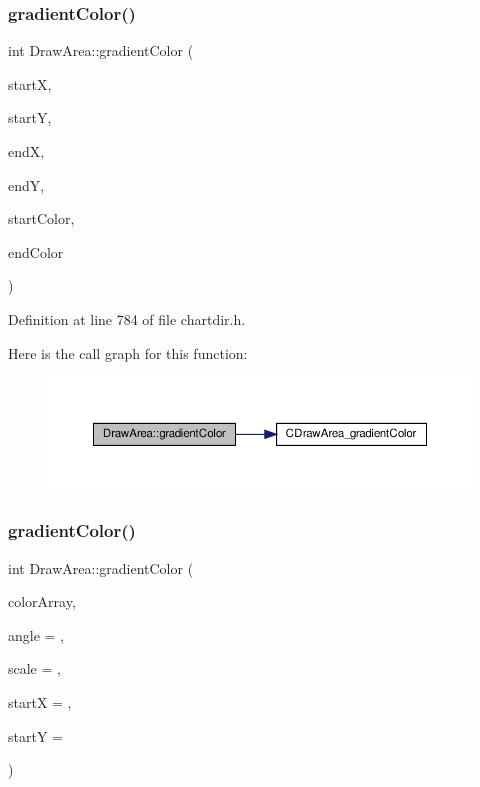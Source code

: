 \subsubsection{\texorpdfstring{gradient\+Color()}{gradientColor()}\hspace{0.1cm}{\footnotesize\ttfamily [1/3]}}
{\footnotesize\ttfamily int Draw\+Area\+::gradient\+Color (\begin{DoxyParamCaption}\item[{int}]{startX,  }\item[{int}]{startY,  }\item[{int}]{endX,  }\item[{int}]{endY,  }\item[{int}]{start\+Color,  }\item[{int}]{end\+Color }\end{DoxyParamCaption})\hspace{0.3cm}{\ttfamily [inline]}}



Definition at line 784 of file chartdir.\+h.

Here is the call graph for this function\+:
\nopagebreak
\begin{figure}[H]
\begin{center}
\leavevmode
\includegraphics[width=350pt]{class_draw_area_a381c8ba9c40cb44ccd70487b16069d2e_cgraph}
\end{center}
\end{figure}
\mbox{\label{class_draw_area_aaca6cafb67a66b3d6f2bd45336539c75}} 
\subsubsection{\texorpdfstring{gradient\+Color()}{gradientColor()}\hspace{0.1cm}{\footnotesize\ttfamily [2/3]}}
{\footnotesize\ttfamily int Draw\+Area\+::gradient\+Color (\begin{DoxyParamCaption}\item[{\hyperlink{class_int_array}{Int\+Array}}]{color\+Array,  }\item[{double}]{angle = {},  }\item[{double}]{scale = {},  }\item[{int}]{startX = {},  }\item[{int}]{startY = {} }\end{DoxyParamCaption})\hspace{0.3cm}{\ttfamily [inline]}}




